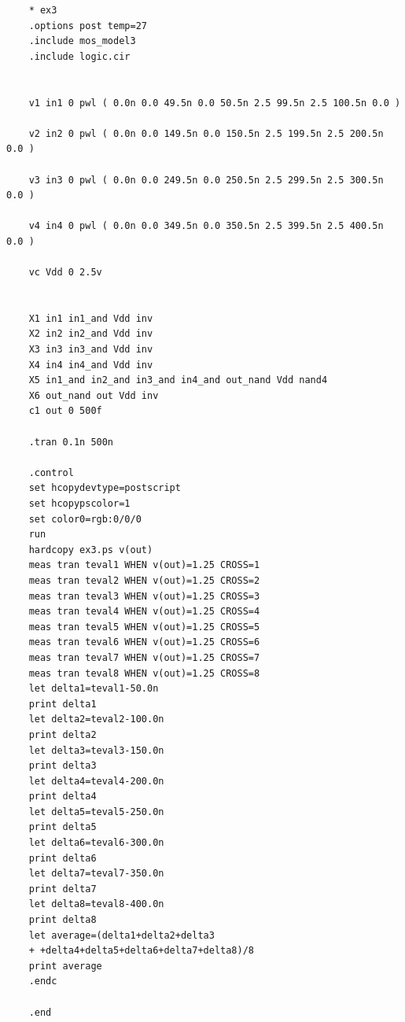 \documentclass{jsarticle}
\begin{document}
\begin{lstlisting}
    * ex3
    .options post temp=27
    .include mos_model3
    .include logic.cir
    
    
    v1 in1 0 pwl ( 0.0n 0.0 49.5n 0.0 50.5n 2.5 99.5n 2.5 100.5n 0.0 )
    
    v2 in2 0 pwl ( 0.0n 0.0 149.5n 0.0 150.5n 2.5 199.5n 2.5 200.5n 0.0 )
    
    v3 in3 0 pwl ( 0.0n 0.0 249.5n 0.0 250.5n 2.5 299.5n 2.5 300.5n 0.0 )
    
    v4 in4 0 pwl ( 0.0n 0.0 349.5n 0.0 350.5n 2.5 399.5n 2.5 400.5n 0.0 )
    
    vc Vdd 0 2.5v
    
    
    X1 in1 in1_and Vdd inv
    X2 in2 in2_and Vdd inv
    X3 in3 in3_and Vdd inv
    X4 in4 in4_and Vdd inv
    X5 in1_and in2_and in3_and in4_and out_nand Vdd nand4
    X6 out_nand out Vdd inv
    c1 out 0 500f
    
    .tran 0.1n 500n
    
    .control
    set hcopydevtype=postscript
    set hcopypscolor=1
    set color0=rgb:0/0/0
    run
    hardcopy ex3.ps v(out)
    meas tran teval1 WHEN v(out)=1.25 CROSS=1
    meas tran teval2 WHEN v(out)=1.25 CROSS=2
    meas tran teval3 WHEN v(out)=1.25 CROSS=3
    meas tran teval4 WHEN v(out)=1.25 CROSS=4
    meas tran teval5 WHEN v(out)=1.25 CROSS=5
    meas tran teval6 WHEN v(out)=1.25 CROSS=6
    meas tran teval7 WHEN v(out)=1.25 CROSS=7
    meas tran teval8 WHEN v(out)=1.25 CROSS=8
    let delta1=teval1-50.0n
    print delta1
    let delta2=teval2-100.0n
    print delta2
    let delta3=teval3-150.0n
    print delta3
    let delta4=teval4-200.0n
    print delta4
    let delta5=teval5-250.0n
    print delta5
    let delta6=teval6-300.0n
    print delta6
    let delta7=teval7-350.0n
    print delta7
    let delta8=teval8-400.0n
    print delta8
    let average=(delta1+delta2+delta3
    + +delta4+delta5+delta6+delta7+delta8)/8
    print average
    .endc
    
    .end
    
\end{lstlisting}
\end{document}
